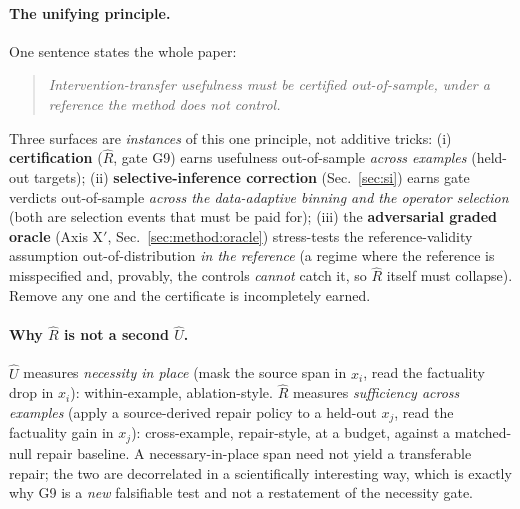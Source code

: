 \documentclass[11pt]{article}
\theoremstyle{plain}
\theoremstyle{definition}
\newcommand{\Uhat}{\widehat{U}}
\newcommand{\Rhat}{\widehat{R}}
\begin{document}
\paragraph{The unifying principle.} One sentence states the whole paper:
\begin{quote}\itshape
Intervention-transfer usefulness must be \emph{certified} out-of-sample, under a
reference the method does not control.
\end{quote}
Three surfaces are \emph{instances} of this one principle, not additive tricks:
(i) \textbf{certification} ($\Rhat$, gate G9) earns usefulness out-of-sample
\emph{across examples} (held-out targets); (ii) \textbf{selective-inference
correction} (Sec.~\ref{sec:si}) earns gate verdicts out-of-sample \emph{across the
data-adaptive binning and the operator selection} (both are selection events that
must be paid for); (iii) the \textbf{adversarial graded oracle} (Axis X$'$,
Sec.~\ref{sec:method:oracle}) stress-tests the reference-validity assumption
out-of-distribution \emph{in the reference} (a regime where the reference is
misspecified and, provably, the controls \emph{cannot} catch it, so $\Rhat$ itself
must collapse). Remove any one and the certificate is incompletely earned.

\paragraph{Why $\Rhat$ is not a second $\Uhat$.} $\Uhat$ measures
\emph{necessity in place} (mask the source span in $x_i$, read the factuality drop
in $x_i$): within-example, ablation-style. $\Rhat$ measures \emph{sufficiency
across examples} (apply a source-derived repair policy to a held-out $x_j$, read
the factuality gain in $x_j$): cross-example, repair-style, at a budget, against a
matched-null repair baseline. A necessary-in-place span need not yield a
transferable repair; the two are decorrelated in a scientifically interesting way,
which is exactly why G9 is a \emph{new} falsifiable test and not a restatement of
the necessity gate.
\end{document}
